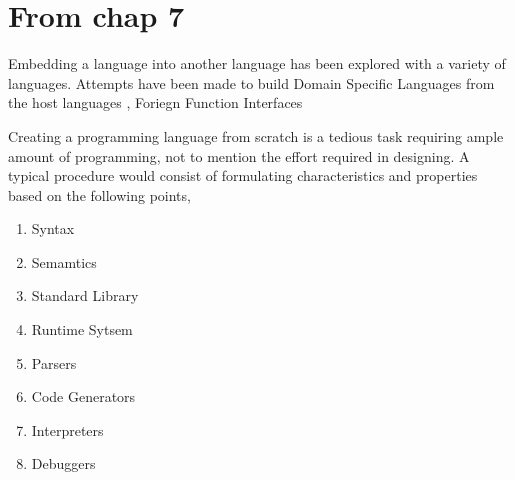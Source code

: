 \documentclass[thesis-solanki.tex]{subfiles}
\begin{document}
\begin{comment}
\begin{description}
\item[$\bullet$]Concatenative Programming Libraries
\begin{enumerate}
	\item peg \cite{peg-lib}
\end{enumerate}

\item[$\bullet$]Constraint Programming and Constraint Handling Rules
\begin{enumerate}
	\item monadiccp \cite{monadiccp-lib}
	\item monadicccp-gecode \cite{monadiccp-gecode-lib}
	\item csp \cite{csp-lib}
	\item liquid fix point \cite{liquid-fix-point-lib}
\end{enumerate}
\end{description}
\end{comment}


\section{\textbf{From chap 7}}

Embedding a language into another language has been explored with a variety of languages. Attempts have been made to build Domain Specific Languages from the host languages \cite{hudak1996building}, Foriegn Function Interfaces \cite{barzilay2004foreign}

Creating a programming language from scratch is a tedious task requiring ample amount of programming, not to mention the effort required in
designing. A typical procedure would consist of formulating characteristics and properties based on the following points,

\begin{enumerate}
\item Syntax
\item Semamtics
\item Standard Library
\item Runtime Sytsem
\item Parsers
\item Code Generators
\item Interpreters
\item Debuggers
\end{enumerate}
\end{document}
